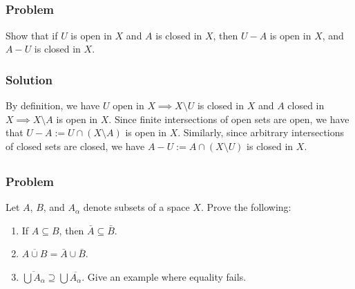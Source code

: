 
\setcounter{subsection}{3} %
\subsection{}

\subsubsection{Problem}
Show that if $U$ is open in $X$ and $A$ is closed in $X$, then $U-A$ is open in $X$, and $A-U$ is closed in $X$.
\subsubsection{Solution}
By definition, we have $U$ open in $X \implies X\setminus U$ is closed in $X$ and $A$ closed in $X \implies X\setminus A$ is open in $X$. Since finite intersections of open sets are open, we have that $U-A := U \cap (X\setminus A)$ is open in $X$. Similarly, since arbitrary intersections of closed sets are closed, we have $A-U := A \cap (X\setminus U)$ is closed in $X$.


\setcounter{subsection}{5} %
\subsection{}

\subsubsection{Problem}
Let $A$, $B$, and $A_\alpha$ denote subsets of a space $X$. Prove the following:
\begin{enumerate}
 \item If $A \subseteq B$, then $\bar{A} \subseteq \bar{B}$.
 \item $\overline{A \cup B} = \bar A \cup \bar B$.
 \item $\overline{\bigcup A_\alpha} \supseteq \bigcup \overline{A_\alpha}$. Give an example where equality fails.
\end{enumerate}
